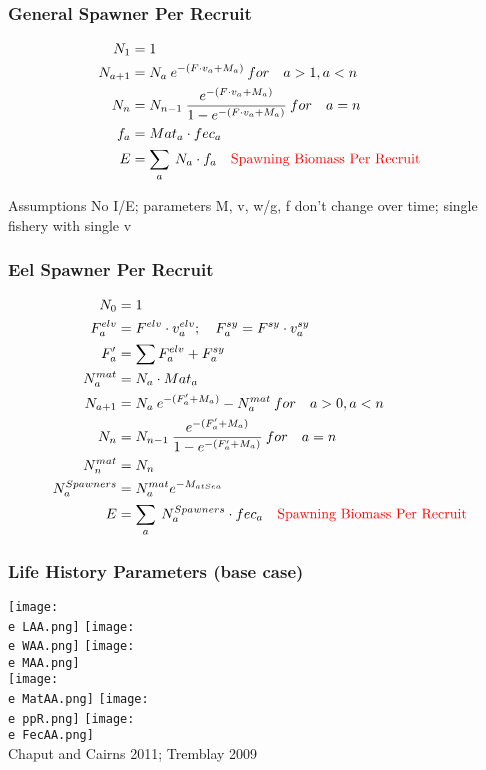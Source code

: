 \documentclass{beamer}
\newcommand{\e}{/backup/bio_data/bio.eels/figures/}
\begin{document}
\begin{frame}
	\frametitle{General Spawner Per Recruit}
	\begin{align*}
		N_1 &= 1 \\
		N_{a+1} &= N_a \: e^{-(F \cdot v_a+M_a)} \: for \quad a > 1, a< n\\ 
		N_{n} &= N_{n-1} \:\frac{e^{-(F \cdot v_a+M_a)}}{1-e^{-(F \cdot v_a +M_a)}}\: for \quad a=n \\
		f_a &= Mat_a \cdot fec_{a}\\
		E &= \sum_a \: N_{a} \cdot f_a \quad \text{\color{red} Spawning Biomass Per Recruit}\\
	\end{align*}
	\begin{block}{Assumptions}
	 No I/E; parameters M, v, w/g, f don't change over time; single fishery with single v 
	\end{block}
\end{frame}


\begin{frame}
	\frametitle{Eel Spawner Per Recruit}
	\begin{align*}
		N_0 &= 1 \\
		F^{elv}_a &= F^{elv} \cdot v^{elv}_a; \quad F^{sy}_a = F^{sy} \cdot v^{sy}_a \\ 
		F'_a &= \sum{ F^{elv}_a+F^{sy}_a } \\
		N^{mat}_a &= N_a \cdot Mat_a \\
		N_{a+1} &= N_a \: e^{-(F'_a +M_a)} - N^{mat}_a \: for \quad a > 0, a< n \\
		N_{n} &= N_{n-1} \:\frac{e^{-(F'_a+M_a)}}{1-e^{-(F'_a +M_a)}}\: for \quad a=n \\
		N^{mat}_n &= N_n \\
		N^{Spawners}_a &= N^{mat}_a e^{-M_{at Sea}} \\
		E &= \sum_a \: N^{Spawners}_a \cdot fec_a \quad \text{\color{red} Spawning Biomass Per Recruit} \\
	\end{align*}
\end{frame}




\begin{frame}
	\frametitle{Life History Parameters (base case)}
	\centering
	  \texttt{[image: \\e LAA.png]}
      \texttt{[image: \\e WAA.png]}
 \texttt{[image: \\e MAA.png]} \\

 \texttt{[image: \\e MatAA.png]}
 \texttt{[image: \\e ppR.png]}
	\texttt{[image: \\e FecAA.png]}\\[-1ex]
	{\tiny Chaput and Cairns 2011; Tremblay 2009 }
\end{frame}
\end{document}
